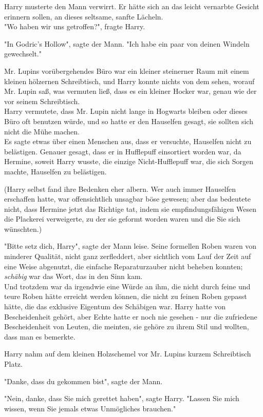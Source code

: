 {Harry musterte den Mann verwirrt. Er hätte sich an das leicht vernarbte Gesicht erinnern sollen, an dieses seltsame, sanfte Lächeln.\\ "Wo haben wir uns getroffen?", fragte Harry.

"In Godric's Hollow", sagte der Mann. "Ich habe ein paar von deinen Windeln gewechselt."

Mr. Lupins vorübergehendes Büro war ein kleiner steinerner Raum mit einem kleinen hölzernen Schreibtisch, und Harry konnte nichts von dem sehen, worauf Mr. Lupin saß, was vermuten ließ, dass es ein kleiner Hocker war, genau wie der vor seinem Schreibtisch.\\ Harry vermutete, dass Mr. Lupin nicht lange in Hogwarts bleiben oder dieses Büro oft benutzen würde, und so hatte er den Hauselfen gesagt, sie sollten sich nicht die Mühe machen.\\ Es sagte etwas über einen Menschen aus, dass er versuchte, Hauselfen nicht zu belästigen. Genauer gesagt, dass er in Hufflepuff einsortiert worden war, da Hermine, soweit Harry wusste, die einzige Nicht-Hufflepuff war, die sich Sorgen machte, Hauselfen zu belästigen.

(Harry selbst fand ihre Bedenken eher albern. Wer auch immer Hauselfen erschaffen hatte, war offensichtlich unsagbar böse gewesen; aber das bedeutete nicht, dass Hermine jetzt das Richtige tat, indem sie empfindungsfähigen Wesen die Plackerei verweigerte, zu der sie geformt worden waren und die Sie sich wünschten.)

"Bitte setz dich, Harry", sagte der Mann leise. Seine formellen Roben waren von minderer Qualität, nicht ganz zerfleddert, aber sichtlich vom Lauf der Zeit auf eine Weise abgenutzt, die einfache Reparaturzauber nicht beheben konnten; \emph{schäbig} war das Wort, das in den Sinn kam.\\ Und trotzdem war da irgendwie eine Würde an ihm, die nicht durch feine und teure Roben hätte erreicht werden können, die nicht zu feinen Roben gepasst hätte, die das exklusive Eigentum des Schäbigen war. Harry hatte von Bescheidenheit gehört, aber Echte hatte er noch nie gesehen - nur die zufriedene Bescheidenheit von Leuten, die meinten, sie gehöre zu ihrem Stil und wollten, dass man es bemerkte.

Harry nahm auf dem kleinen Holzschemel vor Mr. Lupins kurzem Schreibtisch Platz.

"Danke, dass du gekommen bist", sagte der Mann.

"Nein, danke, dass Sie mich gerettet haben", sagte Harry. "Lassen Sie mich wissen, wenn Sie jemals etwas Unmögliches brauchen."

}
